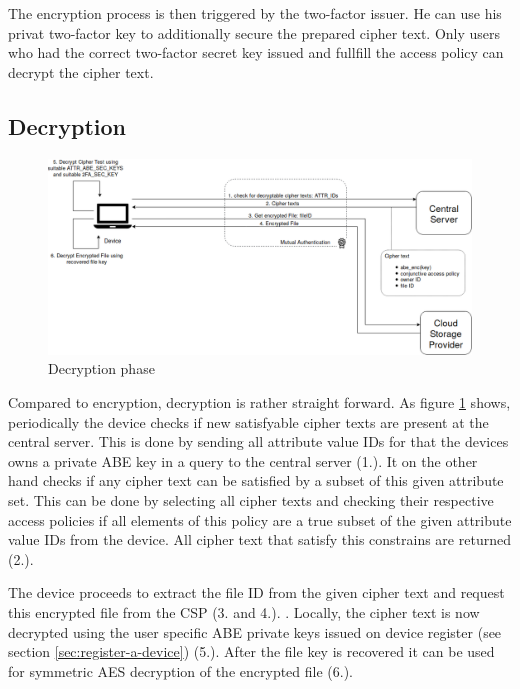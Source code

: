 The encryption process is then triggered by the two-factor issuer. He can use his privat two-factor key to additionally secure the prepared cipher text. Only users who had the correct two-factor secret key issued and fullfill the access policy can decrypt the cipher text. 


\subsection{Decryption}

\begin{figure}[!t]
\centering
    \includegraphics[width=1.0\linewidth]{img/decryption.png}
    \caption{Decryption phase}
    \label{fig:tfdacmacs-decryption}
\end{figure}
Compared to encryption, decryption is rather straight forward. As figure \ref{fig:tfdacmacs-decryption} shows, periodically the device checks if new satisfyable cipher texts are present at the central server. This is done by sending all attribute value IDs for that the devices owns a private ABE key in a query to the central server (1.). It on the other hand checks if any cipher text can be satisfied by a subset of this given attribute set. This can be done by selecting all cipher texts and checking their respective access policies if all elements of this policy are a true subset of the given attribute value IDs from the device. All cipher text that satisfy this constrains are returned (2.).

The device proceeds to extract the file ID from the given cipher text and request this encrypted file from the CSP (3. and 4.). . Locally, the cipher text is now decrypted using the user specific ABE private keys issued on device register (see section \ref{sec:register-a-device}) (5.). After the file key is recovered it can be used for symmetric  AES decryption of the encrypted file (6.). 

